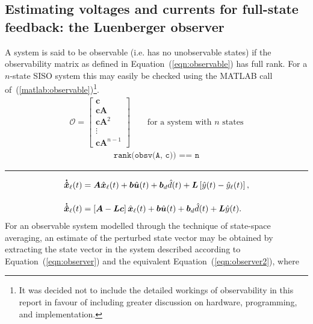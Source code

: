 \subsection{Estimating voltages and currents for full-state feedback: the Luenberger observer}
A system is said to be observable (i.e. has no unobservable states) if the observability matrix as defined in Equation~(\ref{eqn:observable}) has full rank. For a $n$-state SISO system this may easily be checked using the \textsf{MATLAB} call of~(\ref{matlab:observable})\footnote{It was decided not to include the detailed workings of observability in this report in favour of including greater discussion on hardware, programming, and implementation.}.
\begin{align}
\mathcal{O}
=
\begin{bmatrix}
\boldsymbol{c} \\
\boldsymbol{c}\boldsymbol{A} \\
\boldsymbol{c}\boldsymbol{A}^2 \\
\vdots \\
\boldsymbol{c}\boldsymbol{A}^{n - 1}
\end{bmatrix}
\qquad
\text{for a system with } n \text{ states}
\label{eqn:observable}
\end{align}
%
\begin{align}
\texttt{rank(obsv(A, c)) == n}
\label{matlab:observable}
\end{align}
\rule{\textwidth}{0.5pt}
\begin{align}
\boldsymbol{\dot{\hat{x}}}_\ell (t) &= \boldsymbol{A}\hat{\boldsymbol{x}}_\ell(t) + \boldsymbol{b}\hat{\boldsymbol{u}}(t) + \boldsymbol{b}_d \hat{d}(t) + \boldsymbol{L}\left[\hat{y}(t) - \hat{y}_\ell(t)\right],
\label{eqn:observer}
\\[11pt]
\boldsymbol{\dot{\hat{x}}}_\ell (t) &= \left[\boldsymbol{A} - \boldsymbol{L}\boldsymbol{c}\right]\hat{\boldsymbol{x}}_\ell(t) + \boldsymbol{b}\hat{\boldsymbol{u}}(t) + \boldsymbol{b}_d \hat{d}(t) + \boldsymbol{L}\hat{y}(t).
\label{eqn:observer2}
\end{align}
For an observable system modelled through the technique of state-space averaging, an estimate of the perturbed state vector may be obtained by extracting the state vector in the system described according to Equation~(\ref{eqn:observer}) and the equivalent Equation~(\ref{eqn:observer2}), where
